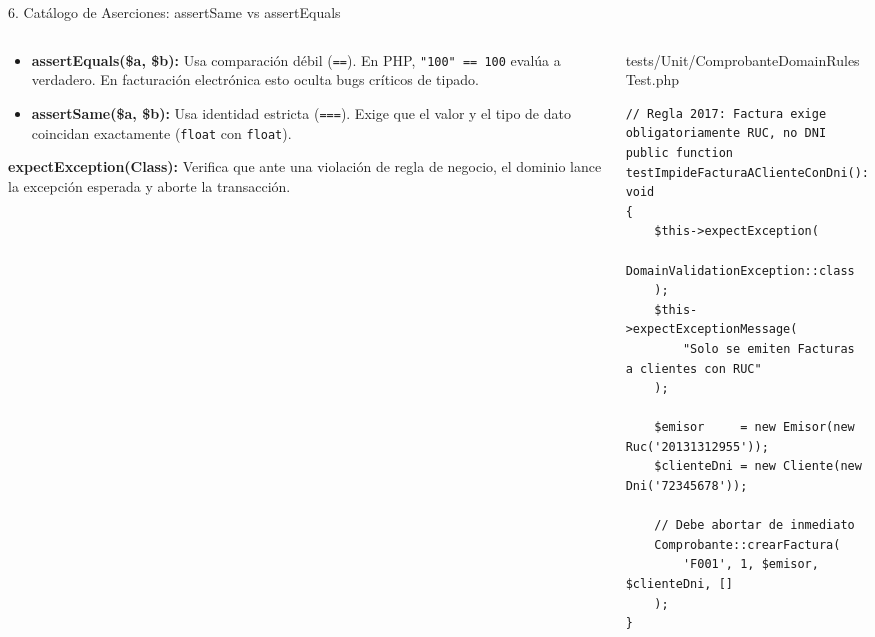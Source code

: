 \documentclass[aspectratio=169,10pt]{beamer}
\begin{document}
\begin{frame}[fragile]{6. Catálogo de Aserciones: assertSame vs assertEquals}
\begin{columns}
\begin{column}{0.48\textwidth}
    \begin{tcolorbox}[colback=cardbg, colframe=cardbg, title=\color{accentamber}\bfseries ¡Cuidado con la Igualdad Débil en Facturación!]
        \begin{itemize}
            \item \textbf{assertEquals(\$a, \$b):} Usa comparación débil (\texttt{==}). En PHP, \texttt{"100" == 100} evalúa a verdadero. En facturación electrónica esto oculta bugs críticos de tipado.
            \item \textbf{assertSame(\$a, \$b):} Usa identidad estricta (\texttt{===}). Exige que el valor y el tipo de dato coincidan exactamente (\texttt{float} con \texttt{float}).
        \end{itemize}
    \end{tcolorbox}
    \vspace{0.1cm}
    \begin{tcolorbox}[colback=cardbg, colframe=cardbg, title=\color{accentblue}\bfseries Aserciones Críticas de Excepción]
        \textbf{expectException(Class):} Verifica que ante una violación de regla de negocio, el dominio lance la excepción esperada y aborte la transacción.
    \end{tcolorbox}
\end{column}
\begin{column}{0.52\textwidth}
    \begin{codebox}{tests/Unit/ComprobanteDomainRulesTest.php}
\begin{lstlisting}
// Regla 2017: Factura exige obligatoriamente RUC, no DNI
public function testImpideFacturaAClienteConDni(): void 
{
    $this->expectException(
        DomainValidationException::class
    );
    $this->expectExceptionMessage(
        "Solo se emiten Facturas a clientes con RUC"
    );

    $emisor     = new Emisor(new Ruc('20131312955'));
    $clienteDni = new Cliente(new Dni('72345678'));

    // Debe abortar de inmediato
    Comprobante::crearFactura(
        'F001', 1, $emisor, $clienteDni, []
    );
}
\end{lstlisting}
    \end{codebox}
\end{column}
\end{columns}
\end{frame}
\end{document}

